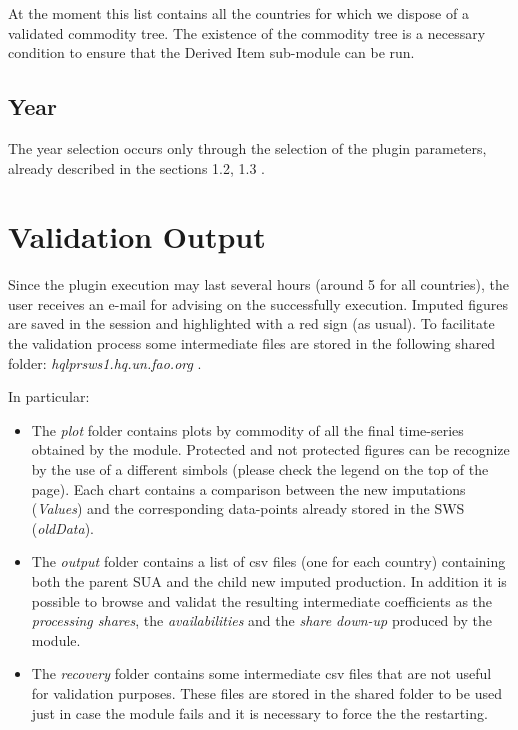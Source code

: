 \documentclass[nojss]{jss}
\begin{document}
At the moment this list contains all the countries for which we dispose of a validated commodity tree. The existence of the commodity tree is a necessary condition to ensure that the Derived Item sub-module can be run.

\subsection{Year}
The year selection occurs only through the selection of the plugin parameters, already described in the sections
1.2, 1.3 .

\section {Validation Output}

Since the plugin execution may last several hours (around 5 for all countries), the user receives an e-mail for advising  on the successfully execution. 
Imputed figures are saved in the session and highlighted with a red sign (as usual). To facilitate the validation process some intermediate files are stored in the following shared folder: \textit{hqlprsws1.hq.un.fao.org }.

In particular:

\begin{itemize}
\item{The \textit{plot} folder contains plots by commodity of all the final time-series obtained by the module. Protected and not protected figures can be recognize by the use of a different simbols (please check the legend on the top of the page). Each chart contains a comparison between the new imputations (\textit{Values}) and the corresponding data-points already stored in the SWS (\textit{oldData}).}
\item{The \textit{output} folder contains a list of csv files (one for each country) containing both the parent SUA and the child new imputed production. In addition it is possible to browse and validat the resulting intermediate coefficients as the \textit{processing shares}, the \textit{availabilities} and the \textit{share down-up} produced by the module}.
\item{The \textit{recovery} folder contains some intermediate csv files that are not useful for validation purposes. These files are stored in the shared folder to be used just in case the module fails and it is necessary to force the the restarting.}
\end{itemize}
\end{document}
